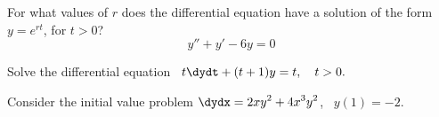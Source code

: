 \documentclass[12pt]{exam}
\begin{document}
    


\newpage

\begin{questions}


\newpage 

\question[2] For what values of $r$ does the differential equation have a solution of the form $y=e^{rt}$, for $t > 0$? $$y''+y'-6y=0$$ %

\vspace{4.5cm} 

\question[2] Solve the differential equation \ $\displaystyle t\dydt + (t+1)y = t , \quad t >0.$  %




    \newpage
    \question
    
    Consider the initial value problem $\displaystyle \dydx = 2xy^2 + 4x^3y^2$, \  $y(1) = -2$. %
    
    
\end{questions}
\end{document}

